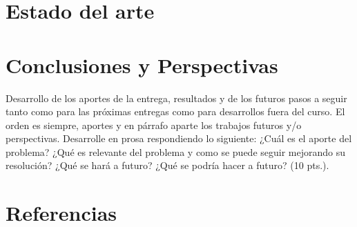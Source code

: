 \documentclass[journal, 10pt]{IEEEtran}
\begin{document}

\section{Estado del arte}






\section{Conclusiones y Perspectivas}

Desarrollo de los aportes de la entrega, resultados y de los futuros pasos a seguir tanto como para las próximas entregas como para desarrollos fuera del curso. El orden es siempre, aportes y en párrafo aparte los trabajos futuros y/o perspectivas. Desarrolle en prosa respondiendo lo siguiente: ¿Cuál es el aporte del problema? ¿Qué es relevante del problema y como se puede seguir mejorando su resolución? ¿Qué se hará a futuro? ¿Qué se podría hacer a futuro? (10 pts.).

\newpage

\section{Referencias}


\end{document}
